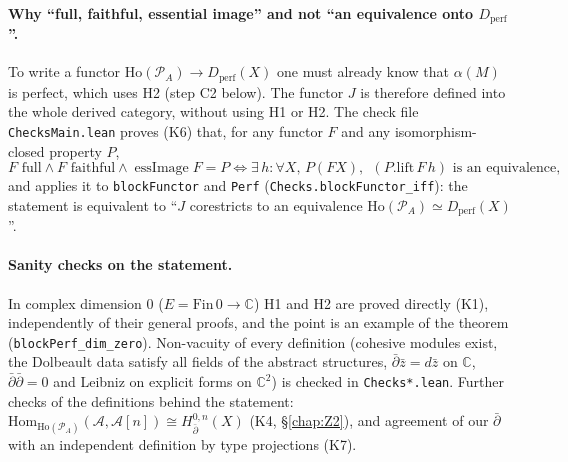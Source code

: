 \paragraph{Why ``full, faithful, essential image'' and not ``an equivalence onto ${D_{\mathrm{perf}}}$''.}
To write a functor ${\mathrm{Ho}}(\mathcal P_A)\to{D_{\mathrm{perf}}}(X)$ one must already know that $\alpha(M)$ is
perfect, which uses H2 (step C2 below). The functor $J$ is therefore defined into the whole
derived category, without using H1 or H2. The check file \texttt{ChecksMain.lean} proves (K6)
that, for any functor $F$ and any isomorphism-closed property $P$,
\[ F \text{ full} \wedge F\text{ faithful}\wedge \operatorname{essImage}F=P \iff
\exists\, h\colon \forall X,\, P(F X),\ \ (P.\mathrm{lift}\,F\,h) \text{ is an equivalence,} \]
and applies it to \texttt{blockFunctor} and \texttt{Perf} (\texttt{Checks.blockFunctor\_iff}): the
statement is equivalent to ``$J$ corestricts to an equivalence ${\mathrm{Ho}}(\mathcal P_A)\simeq{D_{\mathrm{perf}}}(X)$''.

\paragraph{Sanity checks on the statement.} In complex dimension $0$
($E=\mathrm{Fin}\,0\to\mathbb C$) H1 and H2 are proved directly (K1), independently of their
general proofs, and the point is an example of the theorem (\texttt{blockPerf\_dim\_zero}).
Non-vacuity of every definition (cohesive modules exist, the Dolbeault data satisfy all fields of
the abstract structures, ${\bar\partial}\bar z=d\bar z$ on $\mathbb C$, ${\bar\partial}{\bar\partial}=0$ and Leibniz on
explicit forms on $\mathbb C^2$) is checked in \texttt{Checks*.lean}. Further checks of the
definitions behind the statement: ${\mathrm{Hom}}_{{\mathrm{Ho}}(\mathcal P_A)}({\mathcal{A}},{\mathcal{A}}[n])\cong H^{0,n}_{{\bar\partial}}(X)$
(K4, \S\ref{chap:Z2}), and agreement of our ${\bar\partial}$ with an independent definition by type
projections (K7).

